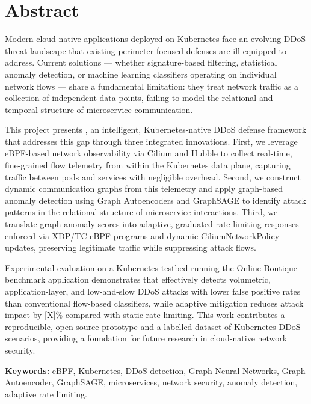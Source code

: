 \chapter*{Abstract}

Modern cloud-native applications deployed on Kubernetes face an evolving DDoS threat
landscape that existing perimeter-focused defenses are ill-equipped to address. Current
solutions --- whether signature-based filtering, statistical anomaly detection, or
machine learning classifiers operating on individual network flows --- share a fundamental
limitation: they treat network traffic as a collection of independent data points, failing
to model the relational and temporal structure of microservice communication.

This project presents \sys{}, an intelligent, Kubernetes-native DDoS defense framework
that addresses this gap through three integrated innovations. First, we leverage
eBPF-based network observability via Cilium and Hubble to collect real-time,
fine-grained flow telemetry from within the Kubernetes data plane, capturing traffic
between pods and services with negligible overhead. Second, we construct dynamic
communication graphs from this telemetry and apply graph-based anomaly detection using
Graph Autoencoders and GraphSAGE to identify attack patterns in the relational structure
of microservice interactions. Third, we translate graph anomaly scores into adaptive,
graduated rate-limiting responses enforced via XDP/TC eBPF programs and dynamic
CiliumNetworkPolicy updates, preserving legitimate traffic while suppressing attack flows.

Experimental evaluation on a Kubernetes testbed running the Online Boutique benchmark
application demonstrates that \sys{} effectively detects volumetric, application-layer,
and low-and-slow DDoS attacks with lower false positive rates than conventional
flow-based classifiers, while adaptive mitigation reduces attack impact by [X]\% compared
with static rate limiting. This work contributes a reproducible, open-source prototype
and a labelled dataset of Kubernetes DDoS scenarios, providing a foundation for future
research in cloud-native network security.

\bigskip
\noindent \textbf{Keywords:} eBPF, Kubernetes, DDoS detection, Graph Neural Networks,
Graph Autoencoder, GraphSAGE, microservices, network security, anomaly detection,
adaptive rate limiting.
